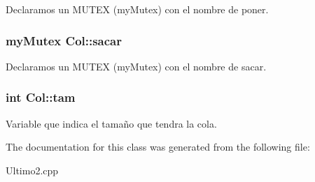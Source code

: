\label{classCol_a2a18e81311998ef10ccaaafa3fbcecdc}
Declaramos un MUTEX (myMutex) con el nombre de poner. \hypertarget{classCol_a3c134f83298f267b175a32b8b96dcfad}{
\subsubsection[{sacar}]{\setlength{\rightskip}{0pt plus 5cm}myMutex {\bf Col::sacar}}}
\label{classCol_a3c134f83298f267b175a32b8b96dcfad}
Declaramos un MUTEX (myMutex) con el nombre de sacar. \hypertarget{classCol_af000355d031ef3ef88535dc8413036d4}{
\subsubsection[{tam}]{\setlength{\rightskip}{0pt plus 5cm}int {\bf Col::tam}}}
\label{classCol_af000355d031ef3ef88535dc8413036d4}
Variable que indica el tamaño que tendra la cola. 

The documentation for this class was generated from the following file:\begin{DoxyCompactItemize}
\item 
Ultimo2.cpp\end{DoxyCompactItemize}
